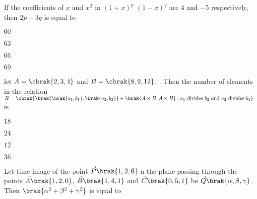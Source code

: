 \iffalse
\title{Assignment-3}
\author{EE24BTECH11049}
\section{mcq-single}
\fi

%
    \item 
    If the coefficients of $x$ and $x^2$ in $(1 + x)^p$ $(1 - x)^q$ are $4$ and $-5$ respectively, then $2p + 3q$ is equal to

    \hfill{}

    \begin{enumerate}
    \begin{multicols}{4}
        \item $60$
        \item $63$
        \item $66$
        \item $69$
    \end{multicols}
    \end{enumerate}

    \item 
    let $A = \cbrak{2, 3, 4}$ and $B =  \cbrak{8, 9, 12}$. . Then the number of elements in the relation $R = \cbrak{\brak{\brak{a_1, b_1}, \brak{a_2, b_2}} \in \brak{A \times B, A \times B} : a_1 \text{ divides } b_2 \text{ and } a_2 \text{ divides } b_1}$ is 

    \hfill{}

    \begin{enumerate}
    \begin{multicols}{4}
        \item $18$
        \item $24$
        \item $12$
        \item $36$
    \end{multicols}
    \end{enumerate}

    \item 
    Let time image of the point $\vec{P}\brak{1, 2, 6}$ n the plane passing through the points $\vec{A}\brak{1, 2, 0}$, $\vec{B}\brak{1, 4, 1}$ and $\vec{C}\brak{0, 5, 1}$ be $\vec{Q}\brak{\alpha, \beta, \gamma}$. Then $\brak{\alpha^2 + \beta^2 + \gamma^2}$ is equal to

    \hfill{}

